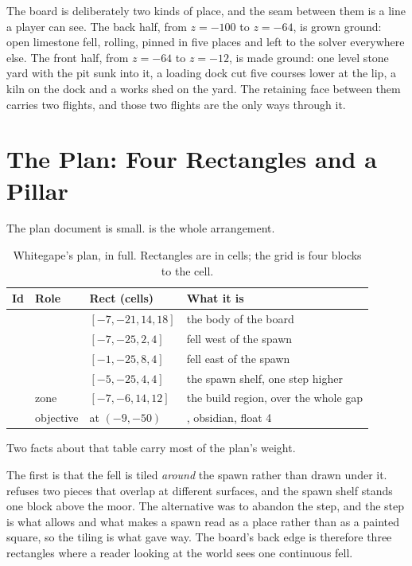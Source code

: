 The board is deliberately two kinds of place, and the seam between them is a
line a player can see. The back half, from $z=-100$ to $z=-64$, is grown
ground: open limestone fell, rolling, pinned in five places and left to the
solver everywhere else. The front half, from $z=-64$ to $z=-12$, is made
ground: one level stone yard with the pit sunk into it, a loading dock cut
five courses lower at the lip, a kiln on the dock and a works shed on the
yard. The retaining face between them carries two flights, and those two
flights are the only ways through it.

\section{The Plan: Four Rectangles and a Pillar}

The plan document is small.  is the whole arrangement.

\begin{table}[htbp]
\caption{Whitegape's plan, in full. Rectangles are in cells; the grid is four
blocks to the cell.}
\label{tab:whitegape-plan}
\small
\begin{tabularx}{\textwidth}{L{2.6cm} L{2.4cm} L{3.4cm} Y}
\toprule
\textbf{Id} & \textbf{Role} & \textbf{Rect (cells)} & \textbf{What it is} \\
\midrule
{}   &  & $[-7,-21,14,18]$ & the body of the board \\
 &  & $[-7,-25,2,4]$ & fell west of the spawn \\
 &  & $[-1,-25,8,4]$ & fell east of the spawn \\
   &  & $[-5,-25,4,4]$ & the spawn shelf, one step higher \\
  & zone & $[-7,-6,14,12]$ & the build region, over the whole gap \\
 & objective & at $(-9,-50)$ & , obsidian, float 4 \\
\bottomrule
\end{tabularx}
\end{table}

Two facts about that table carry most of the plan's weight.

The first is that the fell is tiled \emph{around} the spawn rather than drawn
under it.  refuses two pieces that overlap at different surfaces, and
the spawn shelf stands one block above the moor. The alternative was to
abandon the step, and the step is what  allows and what makes a spawn
read as a place rather than as a painted square, so the tiling is what gave
way. The board's back edge is therefore three rectangles where a reader looking
at the world sees one continuous fell.

